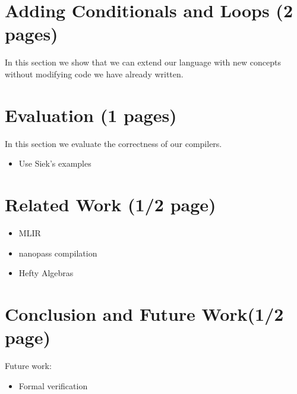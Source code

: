 \documentclass[sigplan,anonymous,review]{acmart}
\begin{document}
\section{Adding Conditionals and Loops (2 pages)} \label{sec:cond-loops}

In this section we show that we can extend our language with new concepts without modifying code we have already written.

\section{Evaluation (1 pages)} \label{sec:evaluation}

In this section we evaluate the correctness of our compilers.

\begin{itemize}
  \item Use Siek's examples
\end{itemize}

\section{Related Work (1/2 page)} \label{sec:related}

\begin{itemize}
  \item MLIR
  \item nanopass compilation
  \item Hefty Algebras
\end{itemize}

\section{Conclusion and Future Work(1/2 page)} \label{sec:conclusion}



Future work:
\begin{itemize}
  \item Formal verification
\end{itemize}
\end{document}
